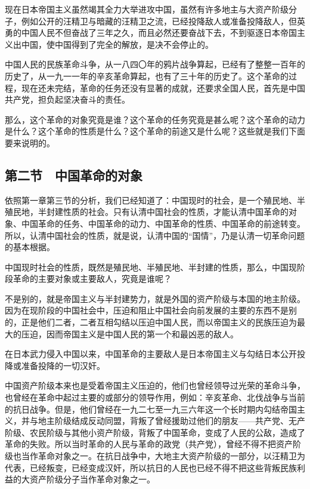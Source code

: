 现在日本帝国主义虽然竭其全力大举进攻中国，虽然有许多地主与大资产阶级分子，例如公开的汪精卫与暗藏的汪精卫之流，已经投降敌人或准备投降敌人，但英勇的中国人民不但奋战了三年之久，而且必然还要奋战下去，不到驱逐日本帝国主义出中国，使中国得到了完全的解放，是决不会停止的。

中国人民的民族革命斗争，从一八四〇年的鸦片战争算起，已经有了整整一百年的历史了，从一九一一年的辛亥革命算起，也有了三十年的历史了。这个革命的过程，现在还未完结，革命的任务还没有显著的成就，还要求全国人民，首先是中国共产党，担负起坚决奋斗的责任。

那么，这个革命的对象究竟是谁？这个革命的任务究竟是甚么呢？这个革命的动力是什么？这个革命的性质是什么？这个革命的前途又是什么呢？这些就是我们下面要来说明的。

\subsection{第二节　中国革命的对象}

依照第一章第三节的分析，我们已经知道了：中国现时的社会，是一个殖民地、半殖民地，半封建性质的社会。只有认清中国社会的性质，才能认清中国革命的对象、中国革命的任务、中国革命的动力、中国革命的性质、中国革命的前途转变。所以，认清中国社会的性质，就是说，认清中国的“国情”，乃是认清一切革命问题的基本根据。

中国现时社会的性质，既然是殖民地、半殖民地、半封建的性质，那么，中国现阶段革命的主要对象或主要敌人，究竟是谁呢？

不是别的，就是帝国主义与半封建势力，就是外国的资产阶级与本国的地主阶级。因为在现阶段的中国社会中，压迫和阻止中国社会向前发展的主要的东西不是别的，正是他们二者，二者互相勾结以压迫中国人民，而以帝国主义的民族压迫为最大的压迫，因而帝国主义是中国人民的第一个和最凶恶的敌人。

在日本武力侵入中国以来，中国革命的主要敌人是日本帝国主义与勾结日本公开投降或准备投降的一切汉奸。

中国资产阶级本来也是受着帝国主义压迫的，他们也曾经领导过光荣的革命斗争，也曾经在革命中起过主要的或部分的领导作用，例如：辛亥革命、北伐战争与当前的抗日战争。但是，他们曾经在一九二七至一九三六年这一个长时期内勾结帝国主义，并与地主阶级结成反动同盟，背叛了曾经援助过他们的朋友——共产党、无产阶级、农民阶级与其他小资产阶级，背叛了中国革命，变成了人民的公敌，造成了革命的失败。所以当时革命的人民与革命的政党（共产党），曾经不得不把资产阶级也当作革命对象之一。在抗日战争中，大地主大资产阶级的一部分，以汪精卫为代表，已经叛变，已经变成汉奸，所以抗日的人民也已经不得不把这些背叛民族利益的大资产阶级分子当作革命对象之一。

